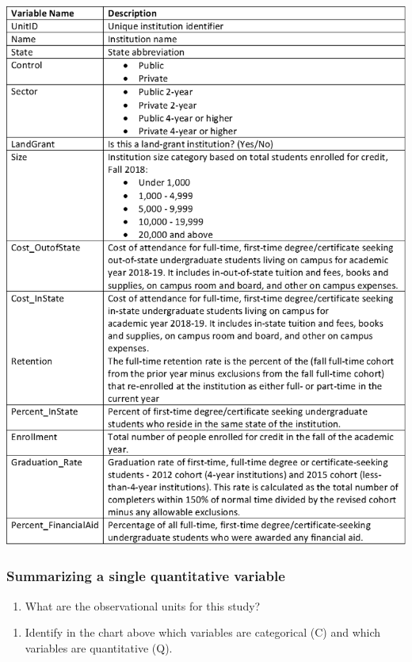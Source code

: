 \documentclass[
]{report}
\providecommand{\tightlist}{%
  \setlength{\itemsep}{0pt}\setlength{\parskip}{0pt}}
\begin{document}
\begin{center}\includegraphics[width=0.75\linewidth]{images/IPEDS_Description} \end{center}

\hypertarget{summarizing-a-single-quantitative-variable-1}{%
\subsubsection{Summarizing a single quantitative variable}\label{summarizing-a-single-quantitative-variable-1}}

\begin{enumerate}
\def\labelenumi{\arabic{enumi}.}
\tightlist
\item
  What are the observational units for this study?
\end{enumerate}

\vspace{0.3in}

\begin{enumerate}
\def\labelenumi{\arabic{enumi}.}
\setcounter{enumi}{1}
\tightlist
\item
  Identify in the chart above which variables are categorical (C) and which variables are quantitative (Q).
\end{enumerate}

\vspace{0.2in}
\end{document}
